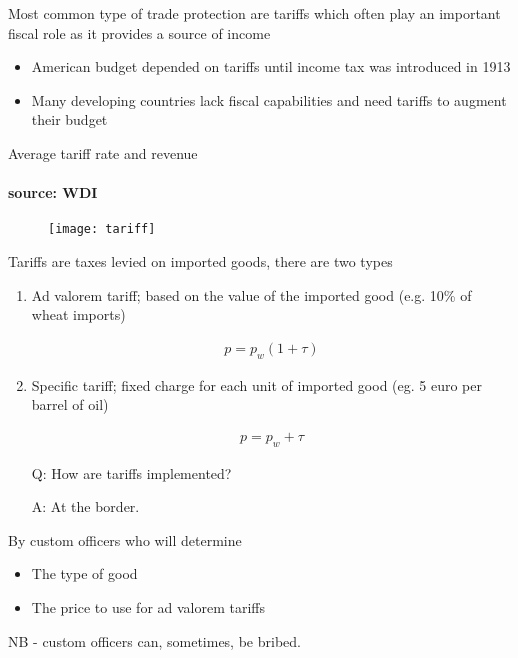 \documentclass{beamer}
\begin{document}
\begin{frame}
Most common type of trade protection are tariffs which often play an important fiscal role as it provides a source of income
  \begin{itemize}
    \item American budget depended on tariffs until income tax was introduced in 1913
    \item Many developing countries lack fiscal capabilities and need tariffs to augment their budget
  \end{itemize}
\end{frame}

\begin{frame}{Average tariff rate and revenue}
\framesubtitle{source: WDI}
  \begin{figure}
    \texttt{[image: tariff]}
  \end{figure}
\end{frame}

\begin{frame}
  Tariffs are taxes levied on imported goods, there are two types
  \begin{enumerate}
    \item Ad valorem tariff; based on the value of the imported good (e.g. 10\% of wheat imports)
    
    \begin{align*}
      p=p_w(1+\tau)
    \end{align*}

    \item Specific tariff; fixed charge for each unit of imported good (eg. 5 euro per barrel of oil)
    
    \begin{align*}
      p=p_w+\tau
    \end{align*}    
  \end{enumerate}
\end{frame}

\begin{frame}
 \begin{itemize}
   \item[Q:] How are tariffs implemented?
   \item[A:] At the border. 
 \end{itemize}
 \medskip
 By custom officers who will determine
 \begin{itemize}
   \item The type of good
   \item The price to use for ad valorem tariffs
 \end{itemize}
 \medskip
 NB - custom officers can, sometimes, be bribed.  
\end{frame}
\end{document}
